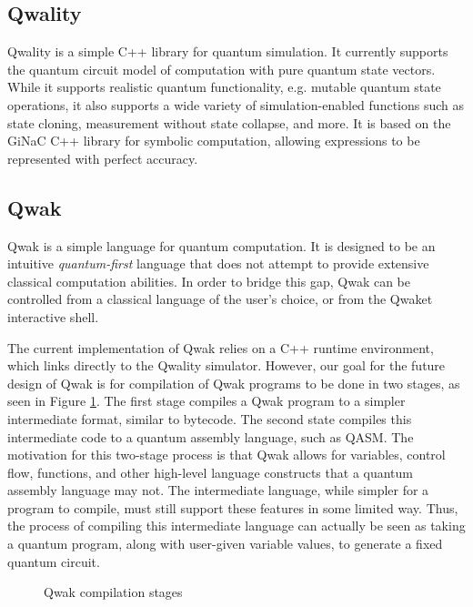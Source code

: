 \documentclass{article}
\begin{document}
\subsection{Qwality}

Qwality is a simple C++ library for quantum simulation. It currently supports the quantum circuit model of computation with pure quantum state vectors. While it supports realistic quantum functionality, e.g. mutable quantum state operations, it also supports a wide variety of simulation-enabled functions such as state cloning, measurement without state collapse, and more. It is based on the GiNaC C++ library for symbolic computation, allowing expressions to be represented with perfect accuracy.

\subsection{Qwak}

Qwak is a simple language for quantum computation. It is designed to be an intuitive \textit{quantum-first} language that does not attempt to provide extensive classical computation abilities. In order to bridge this gap, Qwak can be controlled from a classical language of the user’s choice, or from the Qwaket interactive shell.

The current implementation of Qwak relies on a C++ runtime environment, which links directly to the Qwality simulator. However, our goal for the future design of Qwak is for compilation of Qwak programs to be done in two stages, as seen in Figure \ref{fig:comp-stages}. The first stage compiles a Qwak program to a simpler intermediate format, similar to bytecode. The second state compiles this intermediate code to a quantum assembly language, such as QASM. The motivation for this two-stage process is that Qwak allows for variables, control flow, functions, and other high-level language constructs that a quantum assembly language may not. The intermediate language, while simpler for a program to compile, must still support these features in some limited way. Thus, the process of compiling this intermediate language can actually be seen as taking a quantum program, along with user-given variable values, to generate a fixed quantum circuit.

\begin{figure}[h]
\centering
{}
\caption{Qwak compilation stages} \label{fig:comp-stages}
\end{figure}
\end{document}
